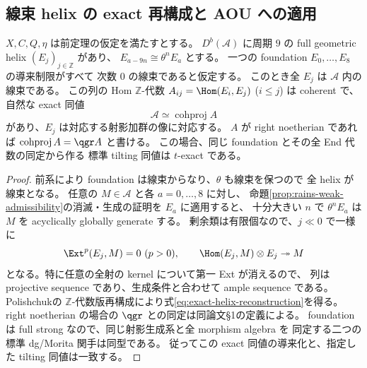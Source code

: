 \subsection{線束 helix の exact 再構成と AOU への適用}
\begin{theorem}\label{thm:restricted-helix-exact}
$X,C,Q,\eta$ は前定理の仮定を満たすとする。
$D^b(\mathcal A)$ に周期 $9$ の full geometric helix $(E_j)_{j\in\mathbb Z}$ があり、
$E_{a-9n}\cong\theta^nE_a$ とする。
一つの foundation $E_0,\ldots,E_8$ の導来制限がすべて
次数 $0$ の線束であると仮定する。
このとき全 $E_j$ は $\mathcal A$ 内の線束である。
この列の Hom $\mathbb Z$-代数 $A_{ij}=\Hom(E_i,E_j)$ ($i\le j$) は coherent で、
自然な exact 同値
\begin{equation}\label{eq:exact-helix-reconstruction}
 \mathcal A\simeq\operatorname{cohproj}A
\end{equation}
があり、$E_j$ は対応する射影加群の像に対応する。
$A$ が right noetherian であれば $\operatorname{cohproj}A=\qgr A$ と書ける。
この場合、同じ foundation とその全 End 代数の同定から作る
標準 tilting 同値は $t$-exact である。
\end{theorem}
\begin{proof}
前系により foundation は線束からなり、$\theta$ も線束を保つので
全 helix が線束となる。
任意の $M\in\mathcal A$ と各 $a=0,\ldots,8$ に対し、
命題\ref{prop:rains-weak-admissibility}の消滅・生成の証明を $E_a$ に適用すると、
十分大きい $n$ で $\theta^nE_a$ は $M$ を acyclically globally generate する。
剰余類は有限個なので、$j\ll0$ で一様に
\[
 \Ext^{p}(E_j,M)=0\ (p>0),\qquad
 \Hom(E_j,M)\otimes E_j\twoheadrightarrow M
\]
となる。特に任意の全射の kernel について第一 Ext が消えるので、
列は projective sequence であり、生成条件と合わせて ample sequence である。
Polishchuk\cite[Lemma 2.1, Theorem 2.4]{PolishchukProj}の
$\mathbb Z$-代数版再構成により式\eqref{eq:exact-helix-reconstruction}を得る。
right noetherian の場合の $\qgr$ との同定は同論文\S1の定義による。
foundation は full strong なので、同じ射影生成系と全 morphism algebra を
同定する二つの標準 dg/Morita 関手は同型である。
従ってこの exact 同値の導来化と、指定した tilting 同値は一致する。
\end{proof}

